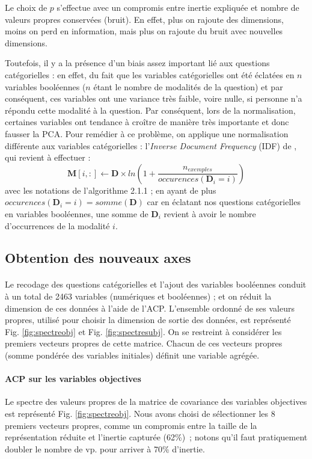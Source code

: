\documentclass[11pt,fleqn,a4paper,openany,frenchb]{book} %
\begin{document}
Le choix de $p$ s'effectue avec un compromis entre inertie expliquée et nombre de valeurs propres conservées (bruit). En effet, plus on rajoute des dimensions, moins on perd en information, mais plus on rajoute du bruit avec nouvelles dimensions.\par

Toutefois, il y a la présence d'un biais assez important lié aux questions catégorielles : en effet, du fait que les variables catégorielles ont été éclatées en $n$ variables booléennes ($n$ étant le nombre de modalités de la question) et par conséquent, ces variables ont une variance très faible, voire nulle, si personne n'a répondu cette modalité à la question. Par conséquent, lors de la normalisation, certaines variables ont tendance à croître de manière très importante et donc fausser la PCA. Pour remédier à ce problème, on applique une normalisation différente aux variables catégorielles : l'\textit{Inverse Document Frequency} (IDF) de \cite{sparckjones1972}, qui revient à effectuer : 
$$\mathbf{M}[i,:]\leftarrow \mathbf{D} \times ln \left(1+\frac{n_{exemples}}{occurences(\mathbf{D}_i=i)}\right)  $$
avec les notations de l'algorithme 2.1.1 ; en ayant de plus $occurences(\mathbf{D}_i=i)=somme(\mathbf{D})$ car en éclatant nos questions catégorielles en variables booléennes, une somme de $\mathbf{D}_i$ revient à avoir le nombre d'occurrences de la modalité $i$.

\subsection{Obtention des nouveaux axes }
\paragraph{}
Le recodage des questions catégorielles et l'ajout des variables booléennes conduit à un total de 2463 variables (numériques et booléennes) ; et on réduit la dimension de ces données à l'aide de l'ACP. L'ensemble ordonné de ses valeurs propres, utilisé pour choisir la dimension de sortie des données, est représenté Fig. \ref{fig:spectreobj} et Fig. \ref{fig:spectresubj}. On se restreint à considérer les premiers vecteurs propres de cette matrice. Chacun de ces vecteurs propres (somme pondérée des variables initiales) définit une variable agrégée. 

\paragraph{ACP sur les variables objectives\\}
Le spectre des valeurs propres de la matrice de covariance des variables objectives est représenté Fig. \ref{fig:spectreobj}.  Nous avons choisi de sélectionner les 8 premiers vecteurs propres, comme un compromis entre la taille de la représentation réduite et l'inertie capturée (62\%)~; notons qu'il faut pratiquement doubler le nombre de vp. pour arriver à 70\% d'inertie. 
\end{document}

